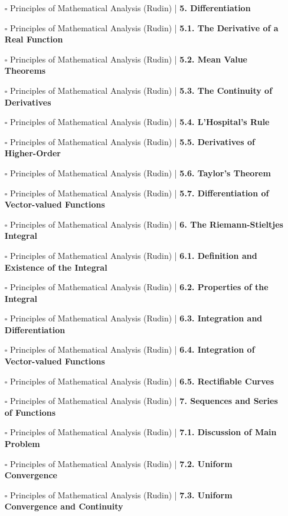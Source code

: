 \documentclass[a4, landscape, 12pt]{article}
\newcommand{\checkbox}{$\square$}%
\begin{document}
\begin{itemize}
{}
\item [\checkbox] Principles of Mathematical Analysis (Rudin)  | \textbf{5. Differentiation
}
\item [\checkbox] Principles of Mathematical Analysis (Rudin)  | \textbf{5.1. The Derivative of a Real Function
}
\item [\checkbox] Principles of Mathematical Analysis (Rudin)  | \textbf{5.2. Mean Value Theorems
}
\item [\checkbox] Principles of Mathematical Analysis (Rudin)  | \textbf{5.3. The Continuity of Derivatives
}
\item [\checkbox] Principles of Mathematical Analysis (Rudin)  | \textbf{5.4. L'Hospital's Rule
}
\item [\checkbox] Principles of Mathematical Analysis (Rudin)  | \textbf{5.5. Derivatives of Higher-Order
}
\item [\checkbox] Principles of Mathematical Analysis (Rudin)  | \textbf{5.6. Taylor's Theorem
}
\item [\checkbox] Principles of Mathematical Analysis (Rudin)  | \textbf{5.7. Differentiation of Vector-valued Functions
}
\item [\checkbox] Principles of Mathematical Analysis (Rudin)  | \textbf{6. The Riemann-Stieltjes Integral
}
\item [\checkbox] Principles of Mathematical Analysis (Rudin)  | \textbf{6.1. Definition and Existence of the Integral
}
\item [\checkbox] Principles of Mathematical Analysis (Rudin)  | \textbf{6.2. Properties of the Integral
}
\item [\checkbox] Principles of Mathematical Analysis (Rudin)  | \textbf{6.3. Integration and Differentiation
}
\item [\checkbox] Principles of Mathematical Analysis (Rudin)  | \textbf{6.4. Integration of Vector-valued Functions
}
\item [\checkbox] Principles of Mathematical Analysis (Rudin)  | \textbf{6.5. Rectifiable Curves
}
\item [\checkbox] Principles of Mathematical Analysis (Rudin)  | \textbf{7. Sequences and Series of Functions
}
\item [\checkbox] Principles of Mathematical Analysis (Rudin)  | \textbf{7.1. Discussion of Main Problem
}
\item [\checkbox] Principles of Mathematical Analysis (Rudin)  | \textbf{7.2. Uniform Convergence
}
\item [\checkbox] Principles of Mathematical Analysis (Rudin)  | \textbf{7.3. Uniform Convergence and Continuity
}
\end{itemize}
\end{document}
